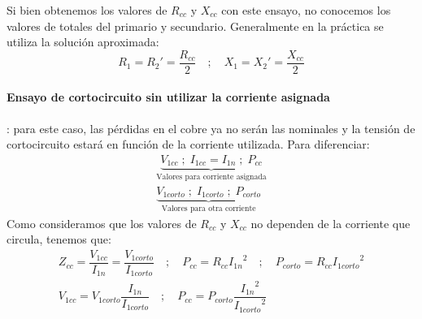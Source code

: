 Si bien obtenemos los valores de $R_{cc}$ y $X_{cc}$ con este ensayo, no conocemos los valores de totales del primario y secundario. Generalmente en la práctica se utiliza la solución aproximada:
\begin{equation*}
	R_{1}=R_{2}'=\dfrac{R_{cc}}{2}\quad;\quad X_{1}=X_{2}'=\dfrac{X_{cc}}{2}
\end{equation*}

\paragraph{Ensayo de cortocircuito sin utilizar la corriente asignada}: para este caso, las pérdidas en el cobre ya no serán las nominales y la tensión de cortocircuito estará en función de la corriente utilizada. Para diferenciar:
\begin{gather*}
	\underbrace{V_{1cc}\; ; \; I_{1cc}=I_{1n} \; ; \; P_{cc}}_{\text{Valores para corriente asignada}}\\
	\underbrace{V_{1corto}\; ; \; I_{1corto} \; ; \; P_{corto}}_{\text{Valores para otra corriente}}
\end{gather*}
Como consideramos que los valores de $R_{cc}$ y $X_{cc}$ no dependen de la corriente que circula, tenemos que:
\begin{gather*}
	Z_{cc}=\dfrac{V_{1cc}}{I_{1n}}=\dfrac{V_{1corto}}{I_{1corto}}\quad ; \quad P_{cc}=R_{cc}{I_{1n}}^{2}\quad ; \quad P_{corto}=R_{cc}{I_{1corto}}^{2}\\
	V_{1cc}=V_{1corto}\dfrac{I_{1n}}{I_{1corto}}\quad;\quad P_{cc}=P_{corto}\dfrac{{I_{1n}}^{2}}{{I_{1corto}}^{2}}
\end{gather*}
